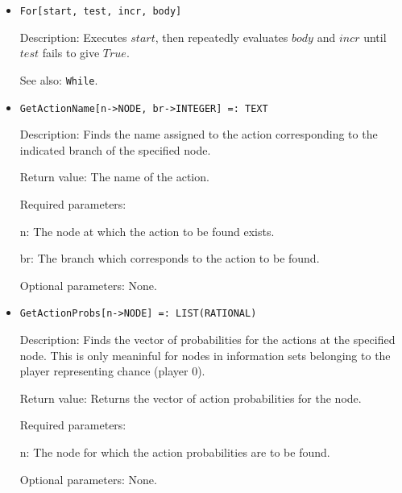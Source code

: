 \begin{itemize}
\item
\protect \large \begin{verbatim}
For[start, test, incr, body]
\end{verbatim}\normalsize

\bd
\item
[Description:] Executes $start$, then repeatedly evaluates $body$ and $incr$
until $test$ fails to give $True$.
\item
[See also:] \verb+While+.
\ed


\item
\protect \large \begin{verbatim}
GetActionName[n->NODE, br->INTEGER] =: TEXT
\end{verbatim}\normalsize

\bd
\item
[Description:] Finds the name assigned to the action corresponding to
the indicated branch of the specified node.
\item   
[Return value:] The name of the action.
\item
[Required parameters:]\hfil\null
	
\bd
\item
[n:] The node at which the action to be found exists.
\item
[br:] The branch which corresponds to the action to be found.
\ed

\item
[Optional parameters:] None.
\ed

\item
\protect \large \begin{verbatim}
GetActionProbs[n->NODE] =: LIST(RATIONAL)
\end{verbatim}\normalsize

\bd
\item
[Description:] Finds the vector of probabilities for the actions at
the specified node.  This is only meaninful for nodes in information
sets belonging to the player representing chance (player 0).
\item
[Return value:] Returns the vector of action probabilities for the
node.
\item
[Required parameters:]\hfil\null
	
\bd
\item
[n:] The node for which the action probabilities are to be found.
\ed

\item
[Optional parameters:] None.
\ed


\end{itemize}
